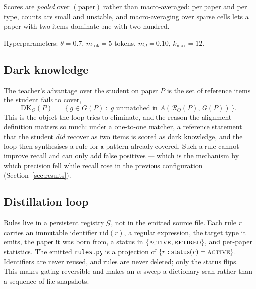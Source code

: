 Scores are \emph{pooled} over $(\text{paper})$ rather than macro-averaged: per
paper and per type, counts are small and unstable, and macro-averaging over
sparse cells lets a paper with two items dominate one with two hundred.

Hyperparameters: $\theta = 0.7$, $m_{\mathrm{tok}} = 5$ tokens, $m_J = 0.10$,
$k_{\max} = 12$.

\subsection{Dark knowledge}
\label{sec:dk}

The teacher's advantage over the student on paper $P$ is the set of reference
items the student fails to cover,
\begin{equation}
  \mathrm{DK}_\Theta(P) \;=\; \{\, g \in G(P) \;:\; g \text{ unmatched in }
    A(\mathcal{R}_\Theta(P),\, G(P)) \,\}.
  \label{eq:dk}
\end{equation}
This is the object the loop tries to eliminate, and the reason the alignment
definition matters so much: under a one-to-one matcher, a reference statement
that the student \emph{did} recover as two items is scored as dark knowledge,
and the loop then synthesises a rule for a pattern already covered. Such a rule
cannot improve recall and can only add false positives --- which is the
mechanism by which precision fell while recall rose in the previous
configuration (Section~\ref{sec:results}).

\subsection{Distillation loop}
\label{sec:loop}

Rules live in a persistent registry $\mathcal{G}$, not in the emitted source
file. Each rule $r$ carries an immutable identifier $\mathrm{uid}(r)$, a regular
expression, the target type it emits, the paper it was born from, a status in
$\{\textsc{active}, \textsc{retired}\}$, and per-paper statistics. The emitted
\texttt{rules.py} is a projection of $\{r : \mathrm{status}(r) =
\textsc{active}\}$. Identifiers are never reused, and rules are never deleted;
only the status flips. This makes gating reversible and makes an $\alpha$-sweep
a dictionary scan rather than a sequence of file snapshots.

